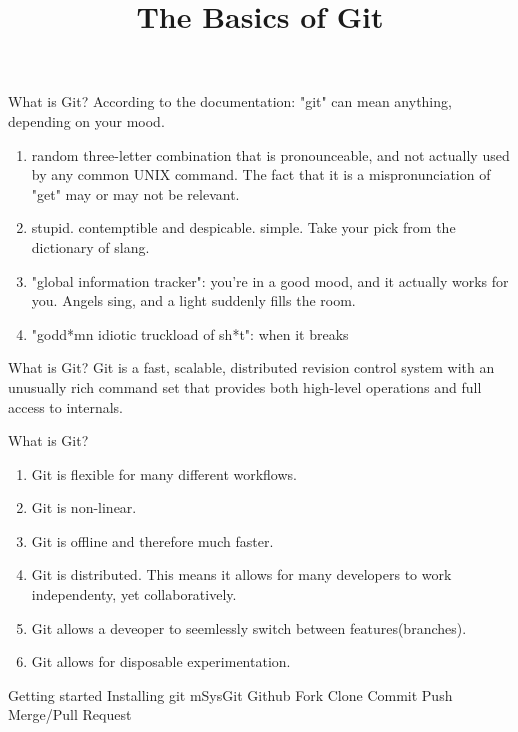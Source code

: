 \documentclass[14pt]{beamer}
\title{The Basics of Git}
\begin{document}
\begin{frame}
\titlepage
\end{frame}

\begin{frame}{What is Git?}
	According to the documentation:\newline
	"git" can mean anything, depending on your mood.
	\begin{enumerate}
		\small
		\item random three-letter combination that is pronounceable, and not
		   actually used by any common UNIX command.  The fact that it is a
		   mispronunciation of "get" may or may not be relevant.
		\item stupid. contemptible and despicable. simple. Take your pick from the
		   dictionary of slang.
		\item "global information tracker": you're in a good mood, and it actually
		   works for you. Angels sing, and a light suddenly fills the room.
		\item "godd*mn idiotic truckload of sh*t": when it breaks
	\end{enumerate}
\end{frame}

\begin{frame}{What is Git?}
	Git is a fast, scalable, distributed revision control system with an
	unusually rich command set that provides both high-level operations
	and full access to internals.
\end{frame}

\begin{frame}{What is Git?}
	\begin{enumerate}
		\small
		\item Git is flexible for many different workflows.
		\item Git is non-linear.
		\item Git is offline and therefore much faster.
		\item Git is distributed.  This means it allows for many
			developers to work independenty, yet collaboratively.
		\item Git allows a deveoper to seemlessly switch between features(branches).
		\item Git allows for disposable experimentation.
	\end{enumerate}
\end{frame}


\begin{frame}{Getting started}
	Installing git
		mSysGit
	Github
		Fork
		Clone
		Commit
		Push
		Merge/Pull Request
\end{frame}
\end{document}
